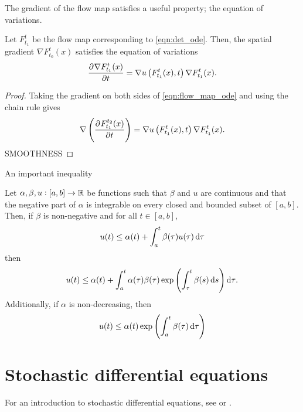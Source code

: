 The gradient of the flow map satisfies a useful property; the equation of variations.
\begin{theorem}
	Let \(F_{t_1}^{t}\) be the flow map corresponding to \eqref{eqn:det_ode}.
	Then, the spatial gradient \(\nabla F_{t_0}^t(x)\) satisfies the equation of variations
	\begin{equation}
		\dpd{\nabla F_{t_1}^{t}(x)}{t} = \nabla u\left(F_{t_1}^{t}(x), t\right) \nabla F_{t_1}^{t}(x).
		\label{eqn:eqn_of_variations}
	\end{equation}
\end{theorem}
\begin{proof}
	Taking the gradient on both sides of \eqref{eqn:flow_map_ode} and using the chain rule gives
	\[
		\nabla\left(\dpd{F_{t_1}^{t_2}(x)}{t}\right) = \nabla u\left(F_{t_1}^{t}(x), t\right) \nabla F_{t_1}^{t}(x).
	\]
	SMOOTHNESS
\end{proof}



An important inequality

\begin{theorem}\label{thm:gronwall}
	Let \(\alpha, \beta, u: [a,b] \to \mathbb{R}\) be functions such that \(\beta\) and \(u\) are continuous and that the negative part of \(\alpha\) is integrable on every closed and bounded subset of \([a,b]\).
	Then, if \(\beta\) is non-negative and for all \(t \in [a,b]\),
	\[
		u(t) \leq \alpha(t) + \int_a^t{\beta(\tau)u(\tau)\dif\tau}
	\]
	then
	\[
		u(t) \leq \alpha(t) + \int_a^t{\alpha(\tau)\beta(\tau)\exp\left(\int_\tau^{t}{\beta(s)\dif s}\right)\dif\tau}.
	\]
	Additionally, if \(\alpha\) is non-decreasing, then
	\[
		u(t) \leq \alpha(t) \exp\left(\int_a^t{\beta(\tau)\dif\tau}\right)
	\]
\end{theorem}



\section{Stochastic differential equations}

For an introduction to stochastic differential equations, see \citet{Oksendal_2003_StochasticDifferentialEquations} or \citet{KallianpurSundar_2014_StochasticAnalysisDiffusion}.


